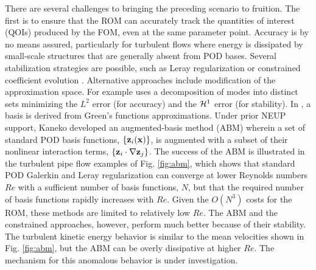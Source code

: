 There are several challenges to bringing the preceding scenario to fruition.
The first is to ensure that the ROM can accurately track the quantities
of interest (QOIs) produced by the FOM, even at the same parameter point.
Accuracy is by no means assured, particularly for turbulent flows
where energy is dissipated by small-scale structures that are generally absent
from POD bases.  Several stabilization strategies are possible, such as Leray
regularization \cite{wang2012proper} or constrained coefficient evolution
\cite{fick18}.  Alternative approaches include modification of the approximation
space.  For example \cite{akkari19} uses a decomposition of modes
into distinct sets minimizing the $L^2$ error (for accuracy) and the ${\cal H}^1$
error (for stability).  In \cite{khodkar2019}, a basis is derived from Green's
functions approximations.
   Under prior NEUP support, Kaneko \cite{kaneko22a,kaneko22} developed an
augmented-basis method (ABM) wherein a set of standard POD basis functions,
$\{{\bf z}_i({\bf x}) \}$,  is augmented with a subset of their nonlinear interaction
terms, $\{{\bf z}_i \cdot \nabla {\bf z}_j\}$.
  The success of the ABM is illustrated in the turbulent pipe flow
examples of Fig. \ref{fig:abm}, which shows that standard POD Galerkin and
Leray regularization can converge at lower Reynolds numbers $Re$ with a
sufficient number of basis functions, $N$, but that the required number of
basis functions rapidly increases with $Re$.  Given the $O(N^3)$ costs for the
ROM, these methods are limited to relatively low $Re$.  The ABM and
the constrained approaches, however, perform much better because of their
stability.  The turbulent kinetic energy behavior is similar to the
mean velocities shown in Fig. \ref{fig:abm}, but the ABM
can be overly dissipative at higher $Re$.  The mechanism for this anomalous
behavior is under investigation.

